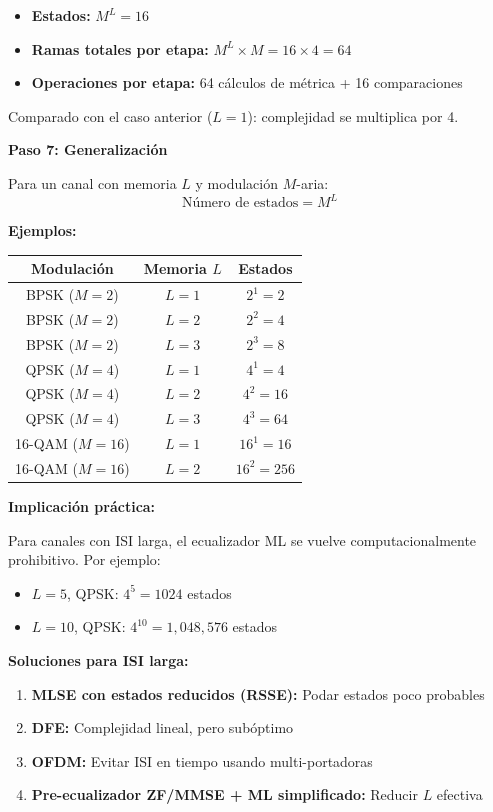 \documentclass[11pt,a4paper]{article}
\begin{document}
\begin{itemize}
    \item \textbf{Estados:} $M^L = 16$
    \item \textbf{Ramas totales por etapa:} $M^L \times M = 16 \times 4 = 64$
    \item \textbf{Operaciones por etapa:} 64 c\'alculos de m\'etrica + 16 comparaciones
\end{itemize}

Comparado con el caso anterior ($L=1$): complejidad se multiplica por 4.

\textbf{Paso 7: Generalizaci\'on}

Para un canal con memoria $L$ y modulaci\'on $M$-aria:
\[
\boxed{\text{N\'umero de estados} = M^L}
\]

\textbf{Ejemplos:}

\begin{center}
\begin{tabular}{|c|c|c|}
\hline
\textbf{Modulaci\'on} & \textbf{Memoria $L$} & \textbf{Estados} \\
\hline
BPSK ($M=2$) & $L=1$ & $2^1 = 2$ \\
BPSK ($M=2$) & $L=2$ & $2^2 = 4$ \\
BPSK ($M=2$) & $L=3$ & $2^3 = 8$ \\
\hline
QPSK ($M=4$) & $L=1$ & $4^1 = 4$ \\
QPSK ($M=4$) & $L=2$ & $4^2 = 16$ \\
QPSK ($M=4$) & $L=3$ & $4^3 = 64$ \\
\hline
16-QAM ($M=16$) & $L=1$ & $16^1 = 16$ \\
16-QAM ($M=16$) & $L=2$ & $16^2 = 256$ \\
\hline
\end{tabular}
\end{center}

\textbf{Implicaci\'on pr\'actica:}

Para canales con ISI larga, el ecualizador ML se vuelve computacionalmente prohibitivo. Por ejemplo:
\begin{itemize}
    \item $L = 5$, QPSK: $4^5 = 1024$ estados
    \item $L = 10$, QPSK: $4^{10} = 1,048,576$ estados
\end{itemize}

\textbf{Soluciones para ISI larga:}

\begin{enumerate}
    \item \textbf{MLSE con estados reducidos (RSSE):} Podar estados poco probables
    \item \textbf{DFE:} Complejidad lineal, pero sub\'optimo
    \item \textbf{OFDM:} Evitar ISI en tiempo usando multi-portadoras
    \item \textbf{Pre-ecualizador ZF/MMSE + ML simplificado:} Reducir $L$ efectiva
\end{enumerate}
\end{document}
